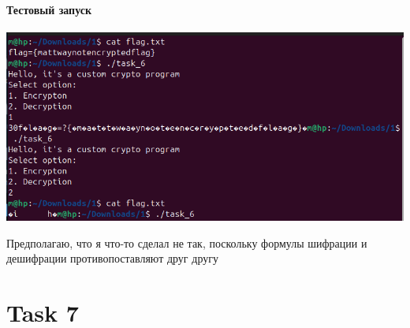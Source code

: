     \paragraph{Тестовый запуск}
    \includegraphics[width=1\linewidth]{static/_task_6.png}

    Предполагаю, что я что-то сделал не так, поскольку формулы шифрации и дешифрации противопоставляют друг другу

    \section*{Task 7}

